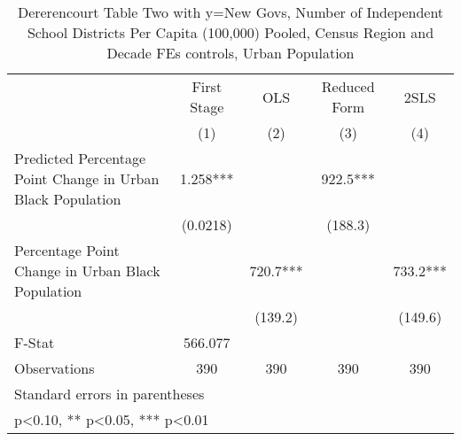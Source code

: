 \begin{table}[htbp]\centering
\def\sym#1{\ifmmode^{#1}\else\(^{#1}\)\fi}
\caption{Dererencourt Table Two with y=New Govs, Number of Independent School Districts Per Capita (100,000) Pooled, Census Region and Decade FEs controls, Urban Population}
\begin{tabular}{l*{4}{c}}
\toprule
                    & First Stage   &         OLS   &Reduced Form   &        2SLS   \\
                    &\multicolumn{1}{c}{(1)}   &\multicolumn{1}{c}{(2)}   &\multicolumn{1}{c}{(3)}   &\multicolumn{1}{c}{(4)}   \\
\midrule
Predicted Percentage Point Change in Urban Black Population&       1.258***&               &       922.5***&               \\
                    &    (0.0218)   &               &     (188.3)   &               \\
\addlinespace
Percentage Point Change in Urban Black Population&               &       720.7***&               &       733.2***\\
                    &               &     (139.2)   &               &     (149.6)   \\
\midrule
F-Stat              &     566.077   &               &               &               \\
Observations        &         390   &         390   &         390   &         390   \\
\bottomrule
\multicolumn{5}{l}{\footnotesize Standard errors in parentheses}\\
\multicolumn{5}{l}{\footnotesize * p<0.10, ** p<0.05, *** p<0.01}\\
\end{tabular}
\end{table}
